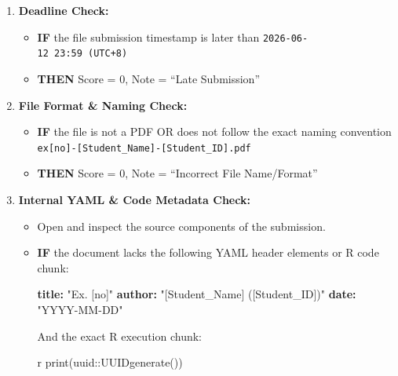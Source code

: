 \documentclass[
]{article}
\newenvironment{Shaded}{\begin{snugshade}}{\end{snugshade}}
\newcommand{\AttributeTok}[1]{\textcolor[rgb]{0.13,0.29,0.53}{#1}}
\newcommand{\FunctionTok}[1]{\textcolor[rgb]{0.13,0.29,0.53}{\textbf{#1}}}
\newcommand{\KeywordTok}[1]{\textcolor[rgb]{0.13,0.29,0.53}{\textbf{#1}}}
\newcommand{\StringTok}[1]{\textcolor[rgb]{0.31,0.60,0.02}{#1}}
\providecommand{\tightlist}{%
  \setlength{\itemsep}{0pt}\setlength{\parskip}{0pt}}
\begin{document}
\begin{enumerate}
\def\labelenumi{\arabic{enumi}.}
\tightlist
\item
  \textbf{Deadline Check:}

  \begin{itemize}
  \tightlist
  \item
    \textbf{IF} the file submission timestamp is later than
    \texttt{2026-06-12\ 23:59\ (UTC+8)}
  \item
    \textbf{THEN} Score = 0, Note = ``Late Submission''
  \end{itemize}
\item
  \textbf{File Format \& Naming Check:}

  \begin{itemize}
  \tightlist
  \item
    \textbf{IF} the file is not a PDF OR does not follow the exact
    naming convention
    \texttt{ex{[}no{]}-{[}Student\_Name{]}-{[}Student\_ID{]}.pdf}
  \item
    \textbf{THEN} Score = 0, Note = ``Incorrect File Name/Format''
  \end{itemize}
\item
  \textbf{Internal YAML \& Code Metadata Check:}

  \begin{itemize}
  \item
    Open and inspect the source components of the submission.
  \item
    \textbf{IF} the document lacks the following YAML header elements or
    R code chunk:

\begin{Shaded}
\begin{Highlighting}[]
\FunctionTok{title}\KeywordTok{:}\AttributeTok{ }\StringTok{"Ex. [no]"}
\FunctionTok{author}\KeywordTok{:}\AttributeTok{ }\StringTok{"[Student\_Name] ([Student\_ID])"}
\FunctionTok{date}\KeywordTok{:}\AttributeTok{ }\StringTok{"YYYY{-}MM{-}DD"}
\end{Highlighting}
\end{Shaded}

    And the exact R execution chunk:

\begin{Shaded}
\begin{Highlighting}[]

\StringTok{\textasciigrave{}\textasciigrave{}\textasciigrave{}}\AttributeTok{ r}
\AttributeTok{print(uuid::UUIDgenerate())}
\end{Highlighting}
\end{Shaded}


\end{itemize}
\end{enumerate}
\end{document}
